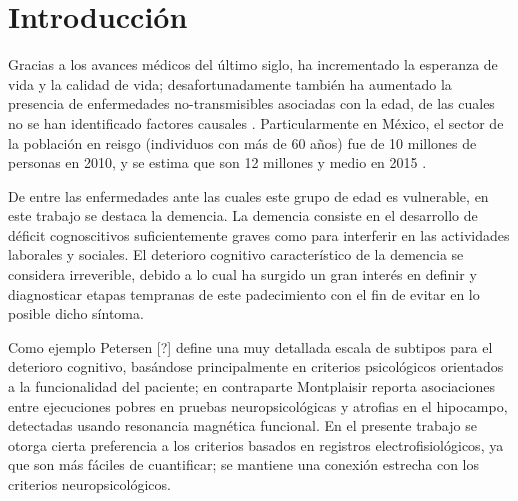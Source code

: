 
\chapter{Introducción}

Gracias a los avances médicos del último siglo, ha incrementado la esperanza de vida y la calidad
de vida; desafortunadamente también ha aumentado la presencia de enfermedades no-transmisibles 
asociadas con la edad, de las cuales no se han identificado factores causales 
\cite{PlanAlzheimer04}.
%
Particularmente en México, el sector de la población en reisgo (individuos con más de 60 años) fue 
de 10 millones de personas en 2010, y se estima que son 12 millones y medio en 2015 
\cite{Censo10,Intercensal15}.


De entre las enfermedades ante las cuales este grupo de edad es vulnerable, en este trabajo se 
destaca la demencia. 
La demencia consiste en el desarrollo de déficit cognoscitivos suficientemente graves como para 
interferir en las actividades laborales y sociales.
%
El deterioro cognitivo característico de la demencia se considera irreverible, debido a lo cual 
ha surgido un gran interés en definir y diagnosticar etapas tempranas de este padecimiento con el 
fin de evitar en lo posible dicho síntoma.

%
Como ejemplo Petersen [?]
define una muy detallada escala de subtipos para el deterioro cognitivo, basándose principalmente
en criterios psicológicos orientados a la funcionalidad del paciente;
%
en contraparte Montplaisir \cite{Brayet16} reporta asociaciones entre ejecuciones pobres en pruebas
neuropsicológicas y atrofias en el hipocampo, detectadas usando resonancia magnética funcional.
En el presente trabajo se otorga cierta preferencia a los criterios basados en registros 
electrofisiológicos, ya que son más fáciles de cuantificar; se mantiene una conexión 
estrecha con los criterios neuropsicológicos.

